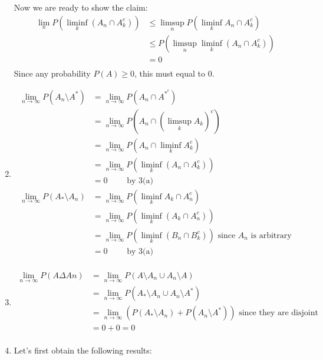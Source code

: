 \documentclass[12pt]{article}
\begin{document}
\begin{problem}[3]
\begin{enumerate}[label=\alph*)]
Now we are ready to show the claim:
\begin{align*}
	\lim_n P(\liminf_{ k} (A_n \cap A_k^{c})) &\leq \limsup_{n} P(\liminf_{ k} A_n \cap A_k^{c}) \\
						  &\leq P\left( \limsup_{  n} \liminf_{ k} (A_n \cap A_k^{c}) \right)  \\
						  &= 0 \\
\end{align*}
Since any probability  $ P(A) \geq 0$, this must equal to 0.
\item 
	\begin{align*}
		\lim_{ n \to \infty} P(A_n \setminus A^* ) &= \lim_{ n \to \infty} P\left( A_n \cap A^{*^c} \right)  \\
							   &= \lim_{ n \to \infty} P\left( A_n \cap  \left( \limsup_{  k} A_k \right)^{c} \right)  \\
							   &= \lim_{ n \to \infty} P\left( A_n \cap \liminf_{ k} A_k^{c} \right)  \\
							   &= \lim_{ n \to \infty} P\left( \liminf_{ k} \left( A_n \cap A_k^{c} \right)  \right)  \\
							   &= 0 \qquad  \text{ by 3(a)}  \\
		\lim_{ n \to \infty} P(A_* \setminus A_n) &= \lim_{ n \to \infty} P\left( \liminf_{ k} A_k \cap A_n^{c} \right)  \\
							  &= \lim_{ n \to \infty} P\left( \liminf_{ k} \left( A_k \cap A_n^{c} \right)  \right)  \\
							  &= \lim_{ n \to \infty} P\left( \liminf_{ k} \left( B_n \cap B_k^{c} \right)  \right) \text{ since } A_n \text{ is arbitrary}   \\
							  &= 0 \qquad \text{ by 3(a)}  \\
	\end{align*}
\item 
	\begin{align*}
		\lim_{ n \to \infty} P\left( A \Delta An \right) &= \lim_{ n \to \infty} P(A\setminus A_n \cup A_n \setminus A )\\
								 &= \lim_{ n \to \infty} P(A_* \setminus A_n \cup A_n \setminus A^* ) \\
								 &= \lim_{ n \to \infty} \left( P(A_*\setminus A_n) +P(A_n \setminus A^* )\right) \text{ since they are disjoint}  \\
								 &= 0+0 = 0 \\
	\end{align*}
\item Let's first obtain the following results:

\end{enumerate}
\end{problem}
\end{document}
